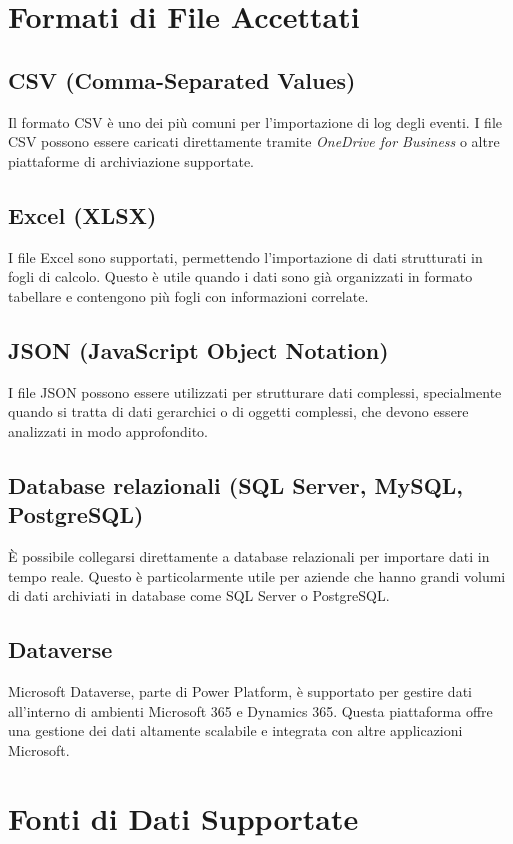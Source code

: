 \documentclass{article}
\begin{document}
\section{Formati di File Accettati}

\subsection{CSV (Comma-Separated Values)}
Il formato CSV è uno dei più comuni per l'importazione di log degli eventi. I file CSV possono essere caricati direttamente tramite \textit{OneDrive for Business} o altre piattaforme di archiviazione supportate.

\subsection{Excel (XLSX)}
I file Excel sono supportati, permettendo l'importazione di dati strutturati in fogli di calcolo. Questo è utile quando i dati sono già organizzati in formato tabellare e contengono più fogli con informazioni correlate.

\subsection{JSON (JavaScript Object Notation)}
I file JSON possono essere utilizzati per strutturare dati complessi, specialmente quando si tratta di dati gerarchici o di oggetti complessi, che devono essere analizzati in modo approfondito.

\subsection{Database relazionali (SQL Server, MySQL, PostgreSQL)}
È possibile collegarsi direttamente a database relazionali per importare dati in tempo reale. Questo è particolarmente utile per aziende che hanno grandi volumi di dati archiviati in database come SQL Server o PostgreSQL.

\subsection{Dataverse}
Microsoft Dataverse, parte di Power Platform, è supportato per gestire dati all'interno di ambienti Microsoft 365 e Dynamics 365. Questa piattaforma offre una gestione dei dati altamente scalabile e integrata con altre applicazioni Microsoft.

\section{Fonti di Dati Supportate}
\end{document}
